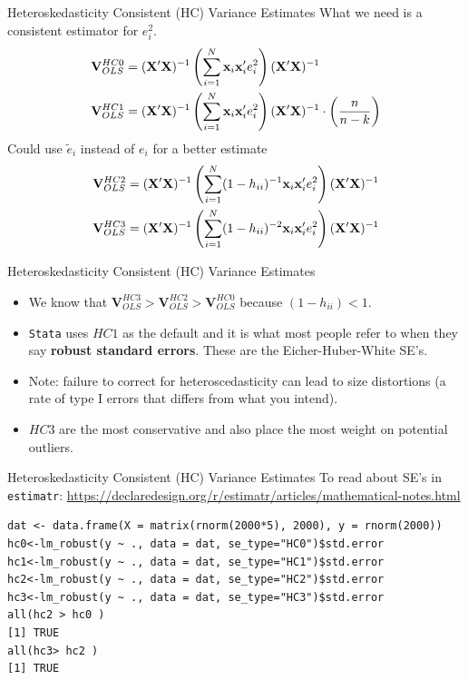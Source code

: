 



\begin{frame}{Heteroskedasticity Consistent (HC) Variance Estimates}
What we need is a consistent estimator for $e^2_i$.
\begin{align*}
\mathbf{V}_{OLS}^{HC0}&= ({\bf X}' {\bf X})^{-1} \left(\sum_{i=1}^N {\bf x}_i {\bf x}_i'  e_i^2 \right) ({\bf X}' {\bf X})^{-1} \\
\mathbf{V}_{OLS}^{HC1}&= ({\bf X}' {\bf X})^{-1} \left(\sum_{i=1}^N {\bf x}_i {\bf x}_i'  e_i^2 \right) ({\bf X}' {\bf X})^{-1} \cdot \left(\frac{n}{n-k}  \right)
\end{align*}
Could use $\tilde{e}_i$ instead of $e_i$ for a better estimate
\begin{align*}
\mathbf{V}_{OLS}^{HC2}&= ({\bf X}' {\bf X})^{-1} \left(\sum_{i=1}^N (1-h_{ii})^{-1} {\bf x}_i {\bf x}_i' e_i^2 \right) ({\bf X}' {\bf X})^{-1} \\
\mathbf{V}_{OLS}^{HC3}&= ({\bf X}' {\bf X})^{-1} \left(\sum_{i=1}^N (1-h_{ii})^{-2} {\bf x}_i {\bf x}_i' e_i^2 \right) ({\bf X}' {\bf X})^{-1} \\
\end{align*}
\end{frame}


\begin{frame}{Heteroskedasticity Consistent (HC) Variance Estimates}
\begin{itemize}
\item We know that $\mathbf{V}_{OLS}^{HC3} > \mathbf{V}_{OLS}^{HC2} > \mathbf{V}_{OLS}^{HC0}$ because $(1- h_{ii}) <1$.
\item \texttt{Stata} uses $HC1$ as the default and it is what most people refer to when they say {\bf robust standard errors}.
	These are the Eicher-Huber-White SE's.
\item Note: failure to correct for heteroscedasticity can lead to size distortions (a rate of type I errors that differs from what you intend). 
\item $HC3$ are the most conservative and also place the most weight on potential outliers.
\end{itemize}
\end{frame}


\begin{frame}[fragile]{Heteroskedasticity Consistent (HC) Variance Estimates}
\footnotesize
To read about SE's in \texttt{estimatr}:
\url{ https://declaredesign.org/r/estimatr/articles/mathematical-notes.html}
\begin{lstlisting}
dat <- data.frame(X = matrix(rnorm(2000*5), 2000), y = rnorm(2000))
hc0<-lm_robust(y ~ ., data = dat, se_type="HC0")$std.error
hc1<-lm_robust(y ~ ., data = dat, se_type="HC1")$std.error
hc2<-lm_robust(y ~ ., data = dat, se_type="HC2")$std.error
hc3<-lm_robust(y ~ ., data = dat, se_type="HC3")$std.error
all(hc2 > hc0 )
[1] TRUE
all(hc3> hc2 )
[1] TRUE
\end{lstlisting}
\end{frame}




